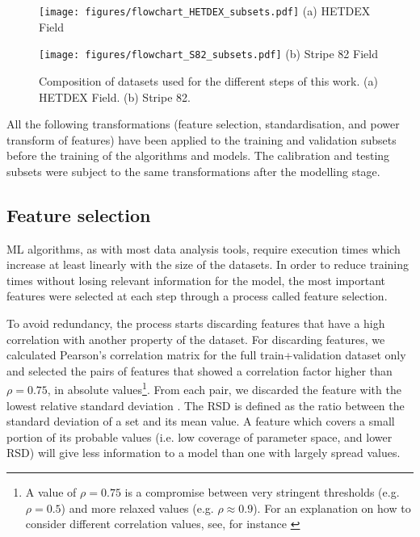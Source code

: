 \documentclass{aa}
\begin{document}
\begin{figure}
  \centering
  \begin{minipage}{0.65\columnwidth}
    \centering
    \texttt{[image: figures/flowchart\_HETDEX\_subsets.pdf]}\hfill\break
    {(a) HETDEX Field}
  \end{minipage}
  \hfill
  \begin{minipage}{0.34\columnwidth}
    \centering
    \texttt{[image: figures/flowchart\_S82\_subsets.pdf]}
    \vspace{3.6cm}\hfill\break
    {(b) Stripe 82 Field}
  \end{minipage}
  \caption{Composition of datasets used for the different steps of this work. (a) HETDEX Field. (b) Stripe 82.}
  \label{fig:dataset_sizes}
\end{figure}

All the following transformations (feature selection, standardisation, and power transform of features) have been applied to the training and validation subsets before the training of the algorithms and models. 
The calibration and testing subsets were subject to the same transformations after the modelling stage.

\subsection{Feature selection}\label{sec:feat_selection}

ML algorithms, as with most data analysis tools, require execution times which increase at least linearly with the size of the datasets. In order to reduce training times without losing relevant information for the model, the most important features were selected at each step through a process called feature selection. 

To avoid redundancy, the process starts discarding features that have a high correlation with another property of the dataset. For discarding features, we calculated Pearson's correlation matrix for the full train+validation dataset only and selected the pairs of features that showed a correlation factor higher than $\rho = 0.75$, in absolute values\footnote{A value of $\rho = 0.75$ is a compromise between very stringent thresholds (e.g. $\rho = 0.5$) and more relaxed values (e.g. $\rho \approx 0.9$). For an explanation on how to consider different correlation values, see, for instance \citet{Ratner2009}}. From each pair, we discarded the feature with the lowest relative standard deviation \citep[RSD;][]{johnson1964statistics}. The RSD is defined as the ratio between the standard deviation of a set and its mean value. A feature which covers a small portion of its probable values (i.e. low coverage of parameter space, and lower RSD) will give less information to a model than one with largely spread values.
\end{document}
